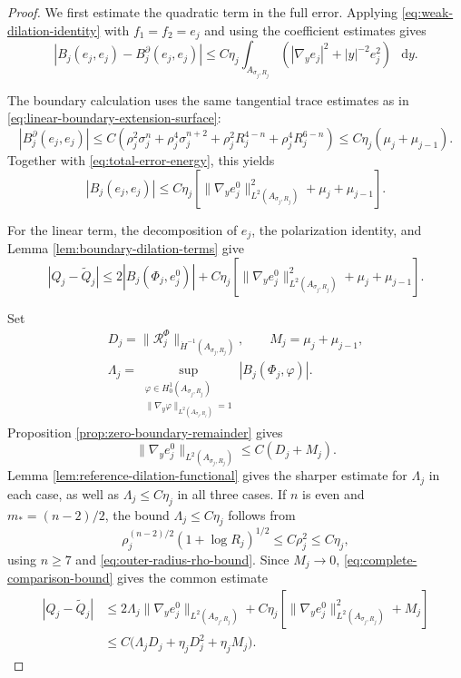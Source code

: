 \documentclass[11pt]{article}
\numberwithin{equation}{section}
\theoremstyle{remark}
\newcommand{\norm}[1]{\lVert #1\rVert}
\newcommand{\dd}{\mathop{}\!\mathrm{d}}
\begin{document}
\par
\begin{proof}
We first estimate the quadratic term in the full error. Applying
\eqref{eq:weak-dilation-identity} with \(f_1=f_2=e_j\) and using the
coefficient estimates gives
\[
 | B_j(e_j,e_j)- B_j^\partial(e_j,e_j)|
 \le C\eta_j\int_{A_{\sigma_j,R_j}}
 \left(|\nabla_ye_j|^2+|y|^{-2}e_j^2\right)\,\dd y.
\]

The boundary calculation uses the same tangential trace estimates as in
\eqref{eq:linear-boundary-extension-surface}:
\[
 | B_j^\partial(e_j,e_j)|
 \le C\left(
 \rho_j^2\sigma_j^n+\rho_j^4\sigma_j^{n+2}
 +\rho_j^2R_j^{4-n}+\rho_j^4R_j^{6-n}\right)
 \le C\eta_j(\mu_j+\mu_{j-1}).
\]
Together with \eqref{eq:total-error-energy}, this yields
\[
 | B_j(e_j,e_j)|
 \le C\eta_j\left[
 \norm{\nabla_ye_j^0}_{L^2(A_{\sigma_j,R_j})}^2
 +\mu_j+\mu_{j-1}\right].
\]

For the linear term, the decomposition of \(e_j\), the polarization
identity, and Lemma  \ref{lem:boundary-dilation-terms} give
\begin{equation}\label{eq:complete-comparison-bound}
 |Q_j-\widetilde Q_j|
 \le 2| B_j(\Phi_j,e_j^0)|
 +C\eta_j\left[
 \norm{\nabla_ye_j^0}_{L^2(A_{\sigma_j,R_j})}^2
 +\mu_j+\mu_{j-1}\right].
\end{equation}


Set
\[
 \begin{gathered}
 D_j=\|\mathcal R_j^\Phi\|_{\dot H^{-1}(A_{\sigma_j,R_j})},
 \qquad M_j=\mu_j+\mu_{j-1},\\
 \Lambda_j=\sup_{\substack{\varphi\in H_0^1(A_{\sigma_j,R_j})\\
 \|\nabla_y\varphi\|_{L^2(A_{\sigma_j,R_j})}=1}}
 |B_j(\Phi_j,\varphi)|.
 \end{gathered}
\]
Proposition  \ref{prop:zero-boundary-remainder} gives
\[
 \|\nabla_ye_j^0\|_{L^2(A_{\sigma_j,R_j})}
 \le C(D_j+M_j).
\]
Lemma  \ref{lem:reference-dilation-functional}
gives the sharper estimate for \(\Lambda_j\) in each case, as well as
\(\Lambda_j\le C\eta_j\) in all three cases. If \(n\) is even and \(m_*=(n-2)/2\), the bound \(\Lambda_j\le C\eta_j\) follows from
\[
 \rho_j^{(n-2)/2}(1+\log R_j)^{1/2}
 \le C\rho_j^2\le C\eta_j,
\]
using \(n\ge7\) and \eqref{eq:outer-radius-rho-bound}.
Since \(M_j\to0\), \eqref{eq:complete-comparison-bound} gives the
common estimate
\begin{equation}\label{eq:uniform-comparison-substitution}
 \begin{aligned}
 |Q_j-\widetilde Q_j|
 &\le2\Lambda_j
 \|\nabla_ye_j^0\|_{L^2(A_{\sigma_j,R_j})}+C\eta_j\left[
 \|\nabla_ye_j^0\|_{L^2(A_{\sigma_j,R_j})}^2+M_j
 \right]\\
 &\le C\bigl(\Lambda_jD_j+\eta_jD_j^2+\eta_jM_j\bigr).
 \end{aligned}
\end{equation}


\end{proof}
\end{document}
